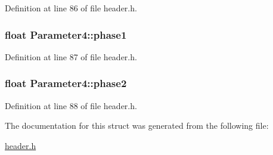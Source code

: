 Definition at line 86 of file header.h.\hypertarget{structParameter4_ab855decf808ae2529c62ec0348dcc347}{
\subsubsection[{phase1}]{\setlength{\rightskip}{0pt plus 5cm}float {\bf Parameter4::phase1}}}
\label{structParameter4_ab855decf808ae2529c62ec0348dcc347}


Definition at line 87 of file header.h.\hypertarget{structParameter4_a8d3535573e5515e839ba7c1606277b00}{
\subsubsection[{phase2}]{\setlength{\rightskip}{0pt plus 5cm}float {\bf Parameter4::phase2}}}
\label{structParameter4_a8d3535573e5515e839ba7c1606277b00}


Definition at line 88 of file header.h.

The documentation for this struct was generated from the following file:\begin{DoxyCompactItemize}
\item 
\hyperlink{header_8h}{header.h}\end{DoxyCompactItemize}
